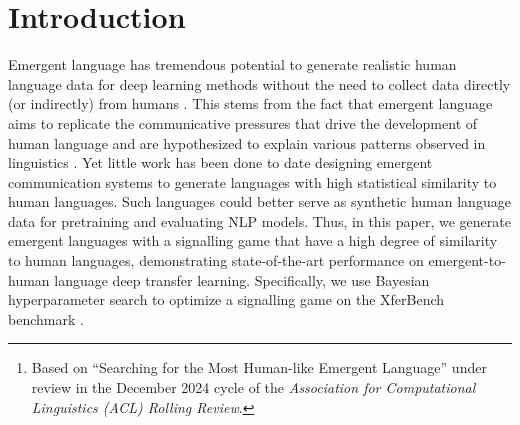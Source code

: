 \begin{abstract}
In this chapter, we design a signalling game-based emergent communication environment to generate state-of-the-art emergent languages in terms of similarity to human language.
This is done with hyperparameter optimization, using XferBench as the objective function.
XferBench quantifies the statistical similarity of emergent language to human language by measuring its suitability for deep transfer learning to human language.
Additionally, we demonstrate the predictive power of entropy on the transfer learning performance of an emergent language as well as validate previous results on the entropy-minimization properties of emergent communication systems.
Finally, we report generalizations regarding what hyperparameters produce more realistic emergent languages, that is, ones which transfer better to human language.
\unskip\footnote{Based on ``Searching for the Most Human-like Emergent Language'' under review in the December 2024 cycle of the \emph{Association for Computational Linguistics (ACL) Rolling Review}.}
\end{abstract}

\section{Introduction}
Emergent language has tremendous potential to generate realistic human language data for deep learning methods without the need to collect data directly (or indirectly) from humans \citep{boldt2024review}.
This stems from the fact that emergent language aims to replicate the communicative pressures that drive the development of human language and are hypothesized to explain various patterns observed in linguistics \citep{sep-linguistics}.
Yet little work has been done to date designing emergent communication systems to generate languages with high statistical similarity to human languages.
Such languages could better serve as synthetic human language data for pretraining and evaluating NLP models.
Thus, in this paper, we generate emergent languages with a signalling game that have a high degree of similarity to human languages, demonstrating state-of-the-art performance on emergent-to-human language deep transfer learning.
Specifically, we use Bayesian hyperparameter search to optimize a signalling game on the XferBench benchmark \citep{boldt-mortensen-2024-xferbench}.

